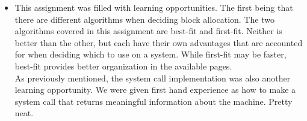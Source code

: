 \documentclass[letterpaper,10pt,onecolumn]{IEEEtran}
\newcommand\tab[1][1cm]{\hspace*{#1}}
\begin{document}
\begin{enumerate}
\begin{itemize}
            \item \tab This assignment was filled with learning opportunities. The first being that there are different algorithms when deciding block allocation. The two algorithms covered in this assignment are best-fit and first-fit. Neither is better than the other, but each have their own advantages that are accounted for when deciding which to use on a system. While first-fit may be faster, best-fit provides better organization in the available pages.\\
            \tab As previously mentioned, the system call implementation was also another learning opportunity. We were given first hand experience as how to make a system call that returns meaningful information about the machine. Pretty neat.
        \end{itemize}
    \end{enumerate}
    
    
\end{document}
